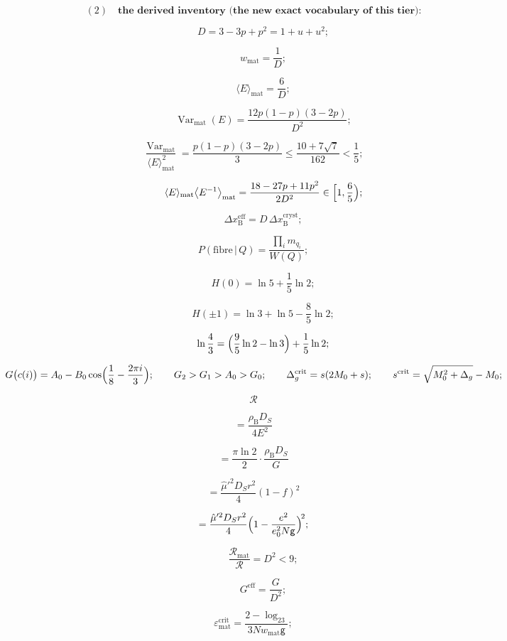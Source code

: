 \documentclass[11pt,openany]{report}
\theoremstyle{canonplain}
\theoremstyle{canondef}
\begin{document}
\[
(2)\quad\textbf{the derived inventory (the new exact vocabulary of this tier):}
\]

\[
\qquad D=3-3p+p^2=1+u+u^2;
\]

\[
\qquad w_{\mathrm{mat}}=\frac1D;
\]

\[
\qquad \langle E\rangle_{\mathrm{mat}}=\frac6D;
\]

\[
\qquad \operatorname{Var}_{\mathrm{mat}}(E)=\frac{12p(1-p)(3-2p)}{D^2};
\]

\[
\frac{\operatorname{Var}_{\mathrm{mat}}}{\langle E\rangle_{\mathrm{mat}}^2}=\frac{p(1-p)(3-2p)}3\le\frac{10+7\sqrt7}{162}<\frac15;
\]

\[
\qquad \langle E\rangle_{\mathrm{mat}}\bigl\langle E^{-1}\bigr\rangle_{\mathrm{mat}}=\frac{18-27p+11p^2}{2D^2}\in\Bigl[1,\frac65\Bigr);
\]

\[
\qquad \Delta x_{\mathrm B}^{\mathrm{eff}}=D\,\Delta x_{\mathrm B}^{\mathrm{cryst}};
\]

\[
P(\text{fibre}\,|\,Q)=\frac{\prod_im_{q_i}}{W(Q)};
\]

\[
\qquad H(0)=\ln5+\frac15\ln2;
\]

\[
\qquad H(\pm1)=\ln3+\ln5-\frac85\ln2;
\]

\[
\qquad \ln\frac43=\Bigl(\frac95\ln2-\ln3\Bigr)+\frac15\ln2;
\]

\[
G\bigl(c(i)\bigr)=A_0-B_0\cos\Bigl(\frac18-\frac{2\pi i}3\Bigr);\qquad G_2>G_1>A_0>G_0;\qquad\Delta_g^{\mathrm{crit}}=s(2M_0+s);\qquad s^{\mathrm{crit}}=\sqrt{M_0^2+\Delta_g}-M_0;
\]

\[
\mathcal R
\]

\[
= \frac{\rho_{\mathrm B}D_S}{4E^2}
\]

\[
= \frac{\pi\ln2}2\cdot\frac{\rho_{\mathrm B}D_S}{G}
\]

\[
= \frac{\hat\mu'^2D_Sr^2}4(1-f)^2
\]

\[
= \frac{\hat\mu'^2D_Sr^2}4\Bigl(1-\frac{e^2}{e_0^2N\mathsf g}\Bigr)^{\!2};
\]

\[
\qquad \frac{\mathcal R_{\mathrm{mat}}}{\mathcal R}=D^2<9;
\]

\[
\qquad G^{\mathrm{eff}}=\frac{G}{D^2};
\]

\[
\varepsilon^{\mathrm{crit}}_{\mathrm{mat}}=\frac{2-\log_23}{3Nw_{\mathrm{mat}}\mathsf g};
\]
\end{document}
